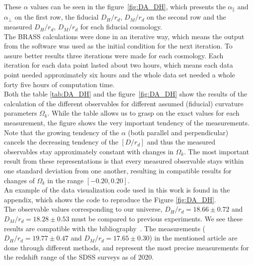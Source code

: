 These $\alpha$ values can be seen in the figure~\ref{fig:DA_DH}, which presents the $\alpha_\parallel$ and $\alpha_\perp$ on the first row, the fiducial $D_H / r_d$, $D_M/r_d $ on the second row and the measured $D_H / r_d$, $D_M /r_d$ for each fiducial cosmology.  \\

The BRASS calculations were done in an iterative way, which means the output from the software was used as the initial condition for the next iteration. To assure better results three iterations were made for each cosmology.  Each iteration for each data point lasted about two hours, which means each data point needed approximately six hours and the whole data set needed a whole forty five hours of computation time.\\

Both the table \ref{tab:DA_DH} and the figure~\ref{fig:DA_DH} show the results of the calculation of the different observables for different assumed (fiducial) curvature parameters $\Omega_k$. While the table allows us to grasp on the exact values for each measurement, the figure shows the very important tendency of the measurements. Note that the growing tendency of the $\alpha$ (both parallel and perpendicular) cancels the decreasing tendency of the $\left[ D /r_d \right] $ and thus the measured observables stay approximately constant with changes in $\Omega_k$. The most important result from these representations is that every measured observable stays within one standard deviation from one another, resulting in compatible results for changes of $\Omega_k$ in the range $\left[ -0.20, 0.20  \right] $. \\

An example of the data visualization code used in this work is found in the appendix, which shows the code to reproduce the Figure \ref{fig:DA_DH}.\\

The observable values corresponding to our universe, $D_H/r_d = 18.66 \pm 0.72$ and $D_M/r_d = 18.28 \pm 0.53$ must be compared to previous experiments. We see these results are compatible with the bibliography~\cite{hector}. The measurements ($D_H/r_d = 19.77\pm0.47$ and $D_M/ r_d=17.65\pm 0.30$) in the mentioned article are done through different methods, and represent the most precise measurements for the redshift range of the SDSS surveys as of 2020.



